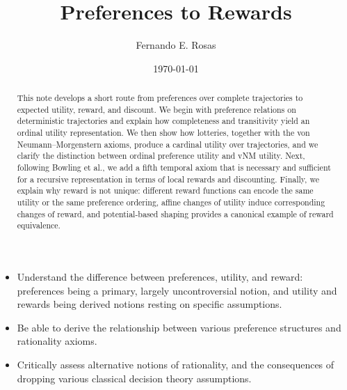 \documentclass[11pt]{article}
\title{Preferences to Rewards}
\author{Fernando E. Rosas}
\date{\today}
\begin{document}
\maketitle

\begin{learningoutcomes}
  \begin{itemize}
    \item Understand the difference between preferences, utility, and reward:
      preferences being a primary, largely uncontroversial notion, and utility
      and rewards being derived notions resting on specific assumptions.
    \item Be able to derive the relationship between various preference
      structures and rationality axioms.
    \item Critically assess alternative notions of rationality, and the
      consequences of dropping various classical decision theory assumptions.
  \end{itemize}
\end{learningoutcomes}


\begin{abstract}
\noindent
This note develops a short route from preferences over complete trajectories to
expected utility, reward, and discount. We begin with preference relations on
deterministic trajectories and explain how completeness and transitivity yield
an ordinal utility representation. We then show how lotteries, together with
the von Neumann--Morgenstern axioms, produce a cardinal utility over
trajectories, and we clarify the distinction between ordinal preference utility
and vNM utility. Next, following Bowling et al., we add a fifth temporal axiom
that is necessary and sufficient for a recursive representation in terms of
local rewards and discounting. Finally, we explain why reward is not unique:
different reward functions can encode the same utility or the same preference
ordering, affine changes of utility induce corresponding changes of reward, and
potential-based shaping provides a canonical example of reward equivalence.
\end{abstract}
\end{document}
